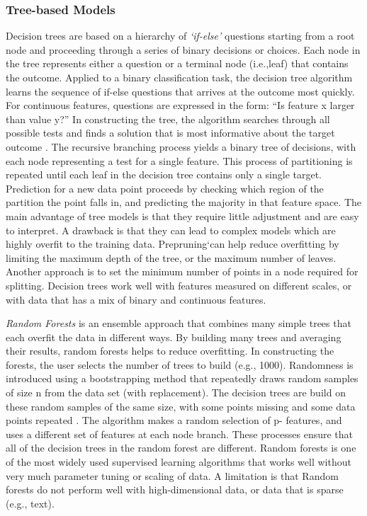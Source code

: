 \documentclass[sigconf]{acmart}
\begin{document}
\subsubsection{Tree-based Models} Decision trees are based on a hierarchy of 
\emph{`if-else'} questions starting from a root node and proceeding through a 
series of binary decisions or choices. Each node in the tree represents either 
a question or a terminal node (i.e.,leaf) that contains the outcome. Applied to 
a binary classification task, the decision tree algorithm learns the sequence
of if-else questions that arrives at the outcome most quickly. For continuous 
features, questions are expressed in the form: ``Is feature x larger than 
value y?'' In constructing the tree, the algorithm searches through all 
possible tests and finds a solution that is most informative about the target 
outcome \cite{muller17}. The recursive branching process yields a binary tree 
of decisions, with each node representing a test for a single feature. This 
process of partitioning is repeated until each leaf in the decision tree 
contains only a single target. Prediction for a new data point proceeds by 
checking which region of the partition the point falls in, and predicting the 
majority in that feature space. The main advantage of tree models is that they 
require little adjustment and are easy to interpret. A drawback is that they 
can lead to complex models which are highly overfit to the training data. 
Prepruning`can help reduce overfitting by limiting the maximum depth of the 
tree, or the maximum number of leaves. Another approach is to set the minimum 
number of points in a node required for splitting. Decision trees work well 
with features measured on different scales, or with data that has a mix of 
binary and continuous features. 


\emph{Random Forests} is an ensemble approach that combines many simple trees 
that each overfit the data in different ways. By building many trees and 
averaging their results, random forests helps to reduce overfitting. In 
constructing the forests, the user selects the number of trees to build 
(e.g., 1000). Randomness is introduced using a bootstrapping method that 
repeatedly draws random samples of size n from the data set (with replacement).  
The decision trees are build on these random samples of the same size, with 
some points missing and some data points repeated \cite{muller17,raschka17}.
The algorithm makes a random selection of p- features, and uses a different 
set of features at each node branch. These processes ensure that all of the 
decision trees in the random forest are different. Random forests is one of 
the most widely used supervised learning algorithms that works well without 
very much parameter tuning or scaling of data. A limitation is that Random 
forests do not perform well with high-dimensional data, or data that is 
sparse (e.g., text).
\end{document}
